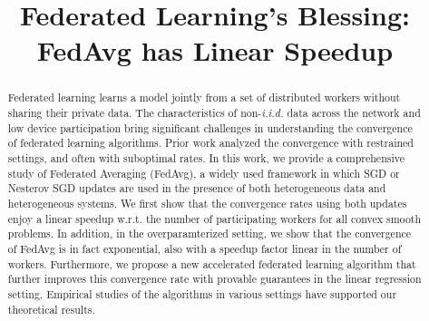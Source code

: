 \documentclass{article}
\title{Federated Learning's Blessing:\\
FedAvg has Linear Speedup}
\author{}
\begin{document}
\maketitle

\begin{abstract}
Federated learning learns
a model jointly from a set of distributed workers without sharing their private
data. The characteristics of non-\emph{i.i.d.} data
across the network and low device participation bring significant challenges
in understanding the convergence of federated learning algorithms. Prior work
analyzed the convergence with restrained settings,
and often with suboptimal rates. 
In this work, we provide a
comprehensive study of Federated Averaging (FedAvg), a widely used framework in which SGD or Nesterov SGD updates are used in the presence of both heterogeneous data and heterogeneous systems. 
We first show that the convergence rates using both updates enjoy a linear speedup w.r.t. the number of participating workers for all convex smooth problems. 
In addition, in the overparamterized setting, we show that the convergence of FedAvg is in fact exponential, also with a speedup factor linear in the number of workers. 
Furthermore, we propose a new accelerated federated learning algorithm that further improves this convergence rate with provable guarantees in the linear regression setting. 
Empirical studies of the algorithms in various settings have supported our theoretical results.
\end{abstract}


%






% 


\newpage




\newpage
\appendix

\end{document}

